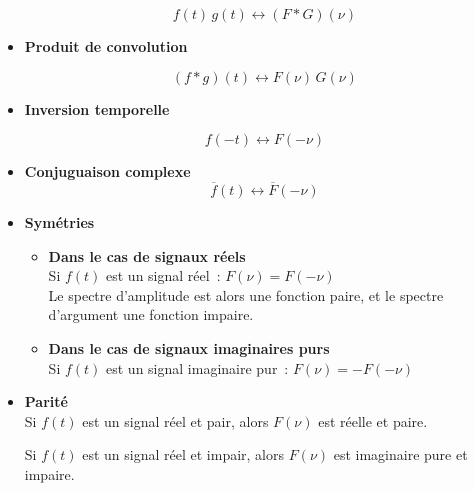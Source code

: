 \begin{itemize}
\begin{equation}
	f(t) \, g(t) \leftrightarrow \left( F \ast G \right)(\nu)
\end{equation}

\item \textbf{Produit de convolution}

\begin{equation}
\left( f \ast g\right)(t) \leftrightarrow F(\nu) \, G(\nu)
\end{equation}

\item \textbf{Inversion temporelle}

\begin{equation}
	f(-t) \leftrightarrow F(-\nu)
\end{equation}
	
\item \textbf{Conjuguaison complexe}
	\begin{equation}
		\overline{f}(t) \leftrightarrow \overline{F}(-\nu)
	\end{equation}

\pagebreak 
\item \textbf{Symétries}\\
\begin{itemize}
\item \textbf{ Dans le cas de signaux réels } \\

Si $f(t)$ est un signal réel~: $F(\nu) = F(-\nu)$ \\

Le spectre d'amplitude est alors une fonction paire, et le spectre d'argument une fonction impaire. \\

	\item \textbf{ Dans le cas de signaux imaginaires purs } \\
	
Si $f(t)$ est un signal imaginaire pur~: $F(\nu) = - F(-\nu)$ \\

\end{itemize}

\item{ \textbf{Parité}} \\

Si $f(t)$ est un signal réel et pair, alors $F(\nu)$ est réelle et paire. 

Si $f(t)$ est un signal réel et impair, alors $F(\nu)$ est imaginaire pure et impaire. 

\end{itemize}


